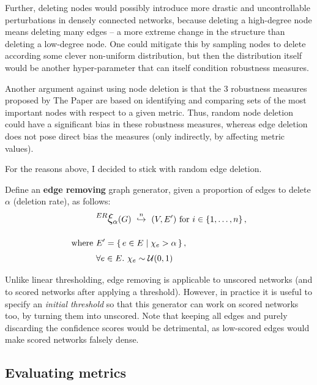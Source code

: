 Further, deleting nodes would possibly introduce more drastic and uncontrollable perturbations in densely connected networks, because deleting a high-degree node means deleting many edges -- a more extreme change in the structure than deleting a low-degree node.
One could mitigate this by sampling nodes to delete according some clever non-uniform distribution, but then the distribution itself would be another hyper-parameter that can itself condition robustness measures.

Another argument against using node deletion is that the 3 robustness measures proposed by The Paper are based on identifying and comparing sets of the most important nodes with respect to a given metric.
Thus, random node deletion could have a significant bias in these robustness measures, whereas edge deletion does not pose direct bias the measures (only indirectly, by affecting metric values).

For the reasons above, I decided to stick with random edge deletion.

\parspace

Define an \textbf{edge removing} graph generator, given a proportion of edges to delete $\alpha$ (deletion rate), as follows:
\begin{align}
    &\mathlarger{^{ER} \mathlarger{\xi}}_\alpha(G) \ \overset{n}{\hookrightarrow}\ (V, E')~\text{for}~i\in \integersto{n}, \label{eq:edge_removing_generator}\\[10pt]
    \text{where}~&E' = \Set{ e \in E }{ \chi_e > \alpha }, \nonumber \\
    &\forall e \in E.\ \chi_e\sim\mathcal{U}(0,1) \nonumber
\end{align}


Unlike linear thresholding, edge removing is applicable to unscored networks (and to scored networks after applying a threshold).
However, in practice it is useful to specify an \textsl{initial threshold} so that this generator can work on scored networks too, by turning them into unscored.
Note that keeping all edges and purely discarding the confidence scores would be detrimental, as low-scored edges would make scored networks falsely dense.

\subsection{Evaluating metrics}\label{sec:evaluating_metrics}

